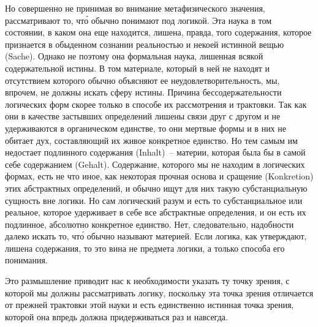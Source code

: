 
Но совершенно не принимая во внимание метафизического
значения, рассматривают то, чт\'о обычно понимают
под логикой. Эта наука в том состоянии, в каком
она еще находится, лишена, правда, того содержания,
которое признается в обыденном сознании реальностью
и некоей истинной вещью (Sache). Однако не поэтому
она формальная наука, лишенная всякой содержательной
истины. В том материале, который в ней не находят и
отсутствием которого обычно объясняют ее неудовлетворительность,
мы, впрочем, не должны искать сферу истины.
Причина бессодержательности логических форм
скорее только в способе их рассмотрения и трактовки.
Так как они в качестве застывших определений лишены
связи друг с другом и не удерживаются в органическом
единстве, то они мертвые формы и в них не обитает дух,
составляющий их живое конкретное единство. Но тем
самым им недостает подлинного содержания (Inhalt)~--
материи, которая была бы в самой себе содержанием
(Gehalt). Содержание, которого мы не находим в логических
формах, есть не что иное, как некоторая прочная
основа и сращение (Konkretion) этих абстрактных определений,
и обычно ищут для них такую субстанциальную
сущность вне логики. Но сам логический разум и
есть то субстанциальное или реальное, которое удерживает
в себе все абстрактные определения, и он есть
их подлинное, абсолютно конкретное единство. Нет,
следовательно, надобности далеко искать то, чт\'о обычно
называют материей. Если логика, как утверждают, лишена
содержания, то это вина не предмета логики, а только
способа его понимания.

Это размышление приводит нас к необходимости указать
ту точку зрения, с которой мы должны рассматривать
логику, поскольку эта точка зрения отличается от
прежней трактовки этой науки и есть единственно истинная
точка зрения, которой она впредь должна придерживаться
раз и навсегда.

